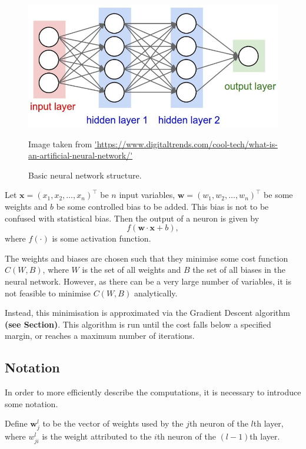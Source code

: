 \documentclass[honours,12pt]{unswthesis}
\numberwithin{equation}{section}
\begin{document}
\begin{figure}[ht]
	\centering
	\includegraphics[width=\textwidth]{Images/3_nnet_structure.jpg}
	\caption{Basic neural network structure.}
	\small Image taken from \url{'https://www.digitaltrends.com/cool-tech/what-is-an-artificial-neural-network/'}
\end{figure}

Let $\mathbf{x} = (x_1, x_2, \ldots, x_n)^\top$ be $n$ input variables, $\mathbf{w} = (w_1, w_2, \ldots, w_n)^\top$ be some weights and $b$ be some controlled bias to be added. This bias is not to be confused with statistical bias. Then the output of a neuron is given by
\[
	f(\mathbf{w}\cdot\mathbf{x} + b),
\]
where $f(\cdot)$ is some activation function.

The weights and biases are chosen such that they minimise some cost function $C(W,B)$, where $W$ is the set of all weights and $B$ the set of all biases in the neural network. However, as there can be a very large number of variables, it is not feasible to minimise $C(W,B)$ analytically.

Instead, this minimisation is approximated via the Gradient Descent algorithm \textbf{(see Section)}. This algorithm is run until the cost falls below a specified margin, or reaches a maximum number of iterations.

\subsection{Notation}\label{nnets-not}

In order to more efficiently describe the computations, it is necessary to introduce some notation.

Define $\mathbf{w}_j^l$ to be the vector of weights used by the $j$th neuron of the $l$th layer, where $w_{ji}^l$ is the weight attributed to the $i$th neuron of the $(l-1)$th layer.
\end{document}
